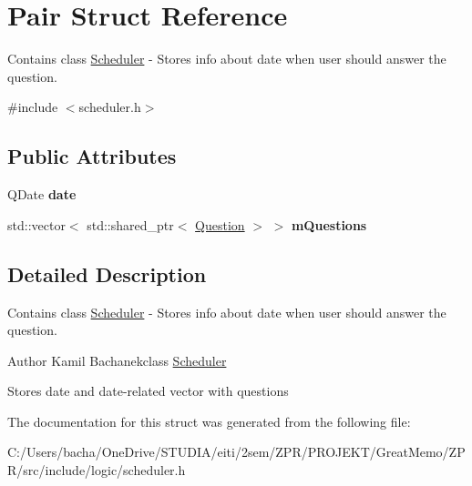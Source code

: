 \hypertarget{struct_pair}{}\section{Pair Struct Reference}
\label{struct_pair}


Contains class \hyperlink{class_scheduler}{Scheduler} -\/ Stores info about date when user should answer the question.  




{\ttfamily \#include $<$scheduler.\+h$>$}

\subsection*{Public Attributes}
\begin{DoxyCompactItemize}
\item 
\mbox{\label{struct_pair_a72858a23bfefd808b55993e72d9df927}} 
Q\+Date {\bfseries date}
\item 
\mbox{\label{struct_pair_a8d00296125432fed34571fb423e36429}} 
std\+::vector$<$ std\+::shared\+\_\+ptr$<$ \hyperlink{class_question}{Question} $>$ $>$ {\bfseries m\+Questions}
\end{DoxyCompactItemize}


\subsection{Detailed Description}
Contains class \hyperlink{class_scheduler}{Scheduler} -\/ Stores info about date when user should answer the question. 

\begin{DoxyAuthor}{Author}
Kamil Bachanekclass \hyperlink{class_scheduler}{Scheduler}
\end{DoxyAuthor}
Stores date and date-\/related vector with questions 

The documentation for this struct was generated from the following file\+:\begin{DoxyCompactItemize}
\item 
C\+:/\+Users/bacha/\+One\+Drive/\+S\+T\+U\+D\+I\+A/eiti/2sem/\+Z\+P\+R/\+P\+R\+O\+J\+E\+K\+T/\+Great\+Memo/\+Z\+P\+R/src/include/logic/scheduler.\+h\end{DoxyCompactItemize}
